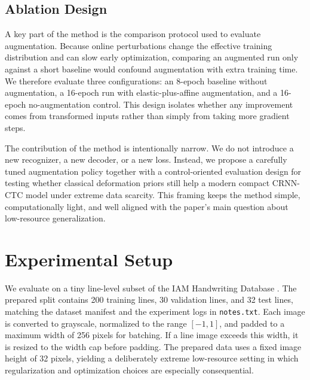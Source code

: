 \documentclass{article} %
\begin{document}
\subsection{Ablation Design}
A key part of the method is the comparison protocol used to evaluate augmentation. Because online perturbations change the effective training distribution and can slow early optimization, comparing an augmented run only against a short baseline would confound augmentation with extra training time. We therefore evaluate three configurations: an 8-epoch baseline without augmentation, a 16-epoch run with elastic-plus-affine augmentation, and a 16-epoch no-augmentation control. This design isolates whether any improvement comes from transformed inputs rather than simply from taking more gradient steps.

The contribution of the method is intentionally narrow. We do not introduce a new recognizer, a new decoder, or a new loss. Instead, we propose a carefully tuned augmentation policy together with a control-oriented evaluation design for testing whether classical deformation priors still help a modern compact CRNN-CTC model under extreme data scarcity. This framing keeps the method simple, computationally light, and well aligned with the paper's main question about low-resource generalization.

\section{Experimental Setup}
\label{sec:experimental}
We evaluate on a tiny line-level subset of the IAM Handwriting Database \citep{marti2002iam}. The prepared split contains 200 training lines, 30 validation lines, and 32 test lines, matching the dataset manifest and the experiment logs in \texttt{notes.txt}. Each image is converted to grayscale, normalized to the range \([-1, 1]\), and padded to a maximum width of 256 pixels for batching. If a line image exceeds this width, it is resized to the width cap before padding. The prepared data uses a fixed image height of 32 pixels, yielding a deliberately extreme low-resource setting in which regularization and optimization choices are especially consequential.
\end{document}
